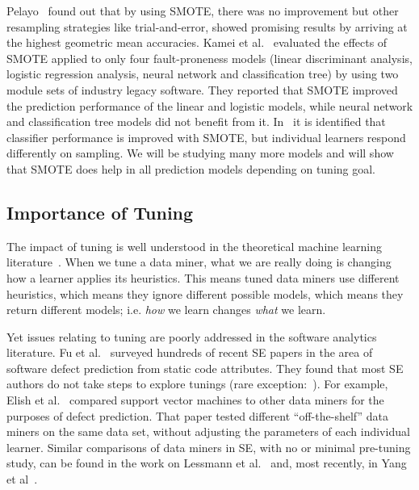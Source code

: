 \documentclass[sigconf,review, anonymous]{acmart}
\theoremstyle{break}
\theoremstyle{break}
\begin{document}
Pelayo~\cite{pelayo2007applying} found out that by using SMOTE, there was no improvement but other resampling strategies like trial-and-error, showed promising results by arriving at the highest geometric mean accuracies. Kamei et al.~\cite{kamei2007effects} evaluated the effects of SMOTE applied to only four fault-proneness models
(linear discriminant analysis, logistic regression
analysis, neural network and classification tree) by
using two module sets of industry legacy software. They reported that SMOTE improved the prediction performance of the linear and logistic models, while neural network and classification tree models did not
benefit from it. In~\cite{van2007experimental} it is identified that classifier performance is improved with SMOTE, but individual learners respond differently on sampling. We will be studying many more models and will show that SMOTE does help in all prediction models depending on tuning goal.

\subsection{Importance of Tuning}
\label{sect:tune}

The impact of tuning is well understood in the theoretical machine learning literature~\cite{bergstra2012random}.  When we tune a
data miner, what we are really doing is changing how a learner applies its
heuristics. This means tuned data miners use different heuristics, which means
they ignore different possible models, which means they return different models;
i.e. \textit{how} we learn changes \textit{what} we learn.

Yet issues relating to
tuning are poorly addressed in the software analytics literature. Fu et al.~\cite{fu2016tuning} surveyed hundreds of recent SE papers in the area
of software defect prediction from static code attributes. They found that most SE
  authors do not take steps to explore tunings (rare exception:~\cite{tantithamthavorn2016icse}). For example, Elish et
  al.~\cite{elish2008predicting} compared support vector machines to other data
  miners for the purposes of defect prediction. That paper tested different
  ``off-the-shelf'' data miners on the same data set, without adjusting the
  parameters of each individual learner. Similar comparisons of data miners in SE,
with no or minimal pre-tuning study, can be found in the work on Lessmann et al.~\cite{4527256}
and, most recently, in Yang et al~\cite{Yang:2016}.  
\end{document}
